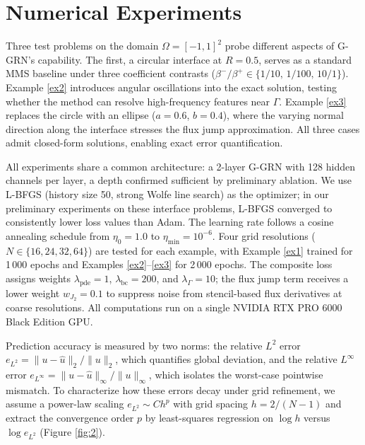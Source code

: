 \documentclass[11pt]{article}
\theoremstyle{definition}
\theoremstyle{remark}
\theoremstyle{plain}
\begin{document}
\section{Numerical Experiments}
\label{sec:experiments}

Three test problems on the domain $\Omega = [-1,1]^2$ probe different aspects of G-GRN's capability. The first, a circular interface at $R=0.5$, serves as a standard MMS baseline under three coefficient contrasts ($\beta^-/\beta^+ \in \{1/10, \, 1/100, \, 10/1\}$). Example \ref{ex2} introduces angular oscillations into the exact solution, testing whether the method can resolve high-frequency features near $\Gamma$. Example \ref{ex3} replaces the circle with an ellipse ($a=0.6$, $b=0.4$), where the varying normal direction along the interface stresses the flux jump approximation. All three cases admit closed-form solutions, enabling exact error quantification.

All experiments share a common architecture: a 2-layer G-GRN with 128 hidden channels per layer, a depth confirmed sufficient by preliminary ablation. We use L-BFGS (history size 50, strong Wolfe line search) as the optimizer; in our preliminary experiments on these interface problems, L-BFGS converged to consistently lower loss values than Adam. The learning rate follows a cosine annealing schedule from $\eta_0 = 1.0$ to $\eta_{\min} = 10^{-6}$. Four grid resolutions ($N \in \{16, 24, 32, 64\}$) are tested for each example, with Example \ref{ex1} trained for 1\,000 epochs and Examples \ref{ex2}--\ref{ex3} for 2\,000 epochs. The composite loss assigns weights $\lambda_{\text{pde}} = 1$, $\lambda_{\text{bc}} = 200$, and $\lambda_{\Gamma} = 10$; the flux jump term receives a lower weight $w_{J_2} = 0.1$ to suppress noise from stencil-based flux derivatives at coarse resolutions. All computations run on a single NVIDIA RTX PRO 6000 Black Edition GPU.

Prediction accuracy is measured by two norms: the relative $L^2$ error $e_{L^2} = \|u - \hat{u}\|_2 / \|u\|_2$, which quantifies global deviation, and the relative $L^\infty$ error $e_{L^\infty} = \|u - \hat{u}\|_\infty / \|u\|_\infty$, which isolates the worst-case pointwise mismatch. To characterize how these errors decay under grid refinement, we assume a power-law scaling $e_{L^2} \sim C h^p$ with grid spacing $h = 2/(N-1)$ and extract the convergence order $p$ by least-squares regression on $\log h$ versus $\log e_{L^2}$ (Figure \ref{fig:2}).
\end{document}
